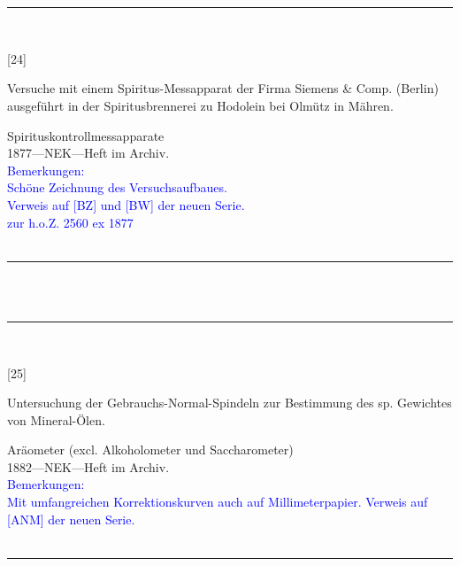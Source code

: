 \\
\vspace*{-2.5pt}\\
\parbox{\textwidth}{%
\rule{\textwidth}{1pt}\vspace*{-3mm}\\
\begin{minipage}[t]{0.15\textwidth}\vspace{0pt}
\Huge\rule[-4mm]{0cm}{1cm}[24]
\end{minipage}
\hfill
\begin{minipage}[t]{0.85\textwidth}\vspace{0pt}
\large Versuche mit einem Spiritus-Messapparat der Firma Siemens \&{} Comp. (Berlin) ausgeführt in der Spiritusbrennerei zu Hodolein bei Olmütz in Mähren.\rule[-2mm]{0mm}{2mm}
\end{minipage}
{\footnotesize\flushright
Spirituskontrollmessapparate\\
}
1877\quad---\quad NEK\quad---\quad Heft im Archiv.\\
\textcolor{blue}{Bemerkungen:\\{}
Schöne Zeichnung des Versuchsaufbaues.\\{}
Verweis auf [BZ] und [BW] der neuen Serie.\\{}
zur h.o.Z. 2560 ex 1877\\{}
}
\\[-15pt]
\rule{\textwidth}{1pt}
}
\\
\vspace*{-2.5pt}\\
\parbox{\textwidth}{%
\rule{\textwidth}{1pt}\vspace*{-3mm}\\
\begin{minipage}[t]{0.15\textwidth}\vspace{0pt}
\Huge\rule[-4mm]{0cm}{1cm}[25]
\end{minipage}
\hfill
\begin{minipage}[t]{0.85\textwidth}\vspace{0pt}
\large Untersuchung der Gebrauchs-Normal-Spindeln zur Bestimmung des sp. Gewichtes von Mineral-Ölen.\rule[-2mm]{0mm}{2mm}
\end{minipage}
{\footnotesize\flushright
Aräometer (excl. Alkoholometer und Saccharometer)\\
}
1882\quad---\quad NEK\quad---\quad Heft im Archiv.\\
\textcolor{blue}{Bemerkungen:\\{}
Mit umfangreichen Korrektionskurven auch auf Millimeterpapier. Verweis auf [ANM] der neuen Serie.\\{}
}
\\[-15pt]
\rule{\textwidth}{1pt}
}
